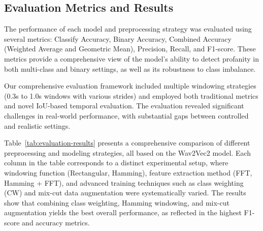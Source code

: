 \documentclass[11pt]{article}
\begin{document}
\subsection{Evaluation Metrics and Results}
The performance of each model and preprocessing strategy was evaluated using several metrics: Classify Accuracy, Binary Accuracy, Combined Accuracy (Weighted Average and Geometric Mean), Precision, Recall, and F1-score. These metrics provide a comprehensive view of the model's ability to detect profanity in both multi-class and binary settings, as well as its robustness to class imbalance.

Our comprehensive evaluation framework included multiple windowing strategies (0.3s to 1.0s windows with various strides) and employed both traditional metrics and novel IoU-based temporal evaluation. The evaluation revealed significant challenges in real-world performance, with substantial gaps between controlled and realistic settings.

Table~\ref{tab:evaluation-results} presents a comprehensive comparison of different preprocessing and modeling strategies, all based on the Wav2Vec2 model. Each column in the table corresponds to a distinct experimental setup, where windowing function (Rectangular, Hamming), feature extraction method (FFT, Hamming + FFT), and advanced training techniques such as class weighting (CW) and mix-cut data augmentation were systematically varied. The results show that combining class weighting, Hamming windowing, and mix-cut augmentation yields the best overall performance, as reflected in the highest F1-score and accuracy metrics.
\end{document}
